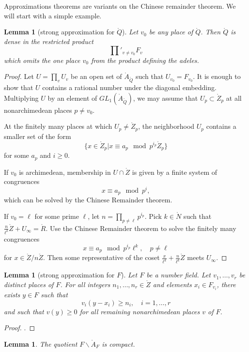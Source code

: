\documentclass{amsart}
\newtheorem{lemma}[equation]{Lemma}
\def\RR{\ring{R}}
\def\ZZ{\ring{Z}}
\def\QQ{\ring{Q}}
\def\AA{\ring{A}}
\begin{document}
Approximations theorems are variants on the Chinese remainder theorem.  We will
start with a simple example.

\begin{lemma}[strong approximation for $\QQ$]
Let $v_0$ be any place of $\QQ$.  Then $\QQ$ is dense in the restricted product
\[
\prod'_{v\ne v_0} F_v
\]
which omits the one place $v_0$ from the product defining the adeles.
\end{lemma}

\begin{proof} Let $U=\prod_v U_v$ be an open set of $\AA_\QQ$ such that $U_{v_0}= F_{v_0}$.
It is enough to show that $U$ contains a rational number under the diagonal embedding.  Multiplying
$U$ by an element of $GL_1(\AA_\QQ)$, we may assume that $U_p \subset \ring{Z}_p$ at all
nonarchimedean places $p\ne v_0$.

At the finitely many places at which $U_p\ne \ring{Z}_p$, 
the neighborhood $U_p$ contains a smaller set of the form
\[
\{x \in \ZZ_p |  x \equiv a_p \mod p^{i_p} \ZZ_p \}
\]
for some $a_p$ and $i\ge 0$.

If $v_0$ is archimedean, membership in $U\cap \ZZ$ is given by a finite system of congruences
\[
x \equiv a_p \mod p^i,
\]
which can be solved by the Chinese Remainder theorem.

If $v_0=\ell$ for some prime $\ell$,  let $n=\prod_{p\ne \ell } p^{i_p}$.
Pick $k\in \ring{N}$ such that
$\frac{n}{\ell^k}\ZZ + U_\infty = \RR$.
Use the Chinese Remainder theorem to solve the finitely many congruences
\[
x \equiv a_p \mod p^{i_p} \ell^k,\quad p\ne \ell
\]
for $x \in \ZZ/n\ZZ$.    Then some representative of the coset 
$\frac{x}{\ell^k} + \frac{n}{\ell^k}\ZZ$ 
meets $U_\infty$.
\end{proof}

\begin{lemma}[strong approximation for $F$]  Let $F$ be a number field.  
Let $v_1,\ldots,v_r$ be distinct places of $F$.
For all integers $n_1,\ldots,n_r\in\ring{Z}$ and elements $x_i\in F_{v_i}$,
there exists $y\in F$ such that
\[
v_i (y - x_i) \ge n_i,\quad i=1,\ldots,r
\]
and such that $v(y)\ge 0$ for all remaining nonarchimedean places $v$
of $F$.
\end{lemma}

\begin{proof} \cite[Th.~6.44]{knapp-advanced}.
\end{proof}


\begin{lemma}  The quotient $F\backslash \AA_F$ is compact.
\end{lemma}
\end{document}

